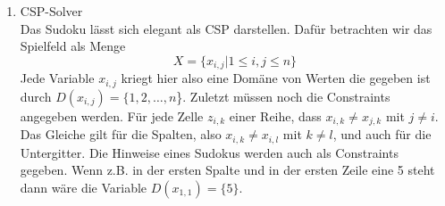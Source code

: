 \begin{enumerate}
    \item CSP-Solver \\
    Das Sudoku lässt sich elegant als CSP darstellen. Dafür betrachten wir das Spielfeld als Menge
    $$
    X = \{x_{i,j}|1 \leq i,j \leq n\}
    $$
    Jede Variable $x_{i,j}$ kriegt hier also eine Domäne von Werten die gegeben ist durch $D(x_{i,j}) = \{1, 2, \dots, n$\}.
    Zuletzt müssen noch die Constraints angegeben werden.
    Für jede Zelle $z_{i, k}$ einer Reihe, dass $x_{i, k} \neq x_{j, k}$ mit $j \neq i$.
    Das Gleiche gilt für die Spalten, also $x_{i, k} \neq x_{i, l}$ mit $k \neq l$, und auch für die Untergitter.
    Die Hinweise eines Sudokus werden auch als Constraints gegeben. Wenn z.B. in der ersten Spalte und in der ersten Zeile eine 5 steht dann wäre die Variable $D(x_{1, 1}) = \{5\}$.



\end{enumerate}
